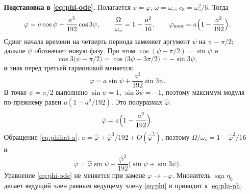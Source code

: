 \textbf{Подстановка в \eqref{eq:phi-ode}.}
Полагается $x=\varphi$, $\omega=\omega_s$, $c_3=\omega_s^2/6$. Тогда
\begin{equation}
\label{eq:phi-cos}
\varphi=a\cos\psi-\frac{a^3}{192}\cos 3\psi,
\qquad
\frac{\Omega}{\omega_s}=1-\frac{a^2}{16},
\qquad
\varphi_{\max}=a\Bigl(1-\frac{a^2}{192}\Bigr).
\end{equation}
Сдвиг начала времени на четверть периода заменяет аргумент $\psi$ на $\psi-\pi/2$; дальше $\psi$ обозначает новую фазу. При этом $\cos(\psi-\pi/2)=\sin\psi$ и
\begin{equation}
\label{eq:c3shift}
\cos 3\bigl(\psi-\pi/2\bigr)
=\cos\bigl(3\psi-3\pi/2\bigr)
=-\sin 3\psi,
\end{equation}
и знак перед третьей гармоникой меняется:
\begin{equation}
\label{eq:phi-sin-a}
\varphi=a\sin\psi+\frac{a^3}{192}\sin 3\psi.
\end{equation}
В точке $\psi=\pi/2$ выполнено $\sin\psi=1$, $\sin 3\psi=-1$, поэтому максимум модуля по-прежнему равен $a(1-a^2/192)$. Это полуразмах $\hat\varphi$:
\begin{equation}
\label{eq:phihat-a}
\hat\varphi=a\Bigl(1-\frac{a^2}{192}\Bigr).
\end{equation}
Обращение \eqref{eq:phihat-a}: $a=\hat\varphi+\hat\varphi^3/192+O(\hat\varphi^5)$, поэтому $\Omega/\omega_s=1-\hat\varphi^2/16$ и
\begin{equation}
\label{eq:phi-series}
\varphi
=\hat\varphi\sin\psi
+\frac{\hat\varphi^3}{192}\bigl(\sin\psi+\sin 3\psi\bigr).
\end{equation}
Уравнение \eqref{eq:phi-ode} не меняется при замене $\varphi\to-\varphi$. Множитель $\operatorname{sgn}\eta_0$ делает ведущий член равным ведущему члену \eqref{eq:phi} и приводит к \eqref{eq:phi-ph}.

